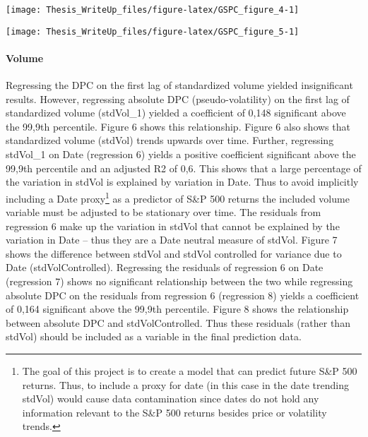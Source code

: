 \documentclass[11pt,preprint, authoryear]{elsarticle}
\let\origfigure\figure
\let\endorigfigure\endfigure
\renewenvironment{figure}[1][2] {
    \expandafter\origfigure\expandafter[H]
} {
    \endorigfigure
}
\numberwithin{equation}{section}
\numberwithin{figure}{section}
\numberwithin{table}{section}
\let\rmarkdownfootnote\footnote%
\def\footnote{\protect\rmarkdownfootnote}
\begin{document}
\begin{figure}[H]

{\centering \texttt{[image: Thesis\_WriteUp\_files/figure-latex/GSPC\_figure\_4-1]} 

}

\caption{S and P 500 Daily Percentage Change 1950 – Present \label{Figure4}}\label{fig:GSPC_figure_4}
\end{figure}

\begin{figure}[H]

{\centering \texttt{[image: Thesis\_WriteUp\_files/figure-latex/GSPC\_figure\_5-1]} 

}

\caption{Standardized volume (red) and absolute logDiff (green) \label{Figure5}}\label{fig:GSPC_figure_5}
\end{figure}

\hypertarget{volume}{%
\paragraph{Volume}\label{volume}}

Regressing the DPC on the first lag of standardized volume yielded
insignificant results. However, regressing absolute DPC
(pseudo-volatility) on the first lag of standardized volume (stdVol\_1)
yielded a coefficient of 0,148 significant above the 99,9th percentile.
Figure 6 shows this relationship. Figure 6 also shows that standardized
volume (stdVol) trends upwards over time. Further, regressing stdVol\_1
on Date (regression 6) yields a positive coefficient significant above
the 99,9th percentile and an adjusted R2 of 0,6. This shows that a large
percentage of the variation in stdVol is explained by variation in Date.
Thus to avoid implicitly including a Date proxy\footnote{The goal of
  this project is to create a model that can predict future S\&P 500
  returns. Thus, to include a proxy for date (in this case in the date
  trending stdVol) would cause data contamination since dates do not
  hold any information relevant to the S\&P 500 returns besides price or
  volatility trends.} as a predictor of S\&P 500 returns the included
volume variable must be adjusted to be stationary over time. The
residuals from regression 6 make up the variation in stdVol that cannot
be explained by the variation in Date -- thus they are a Date neutral
measure of stdVol. Figure 7 shows the difference between stdVol and
stdVol controlled for variance due to Date (stdVolControlled).
Regressing the residuals of regression 6 on Date (regression 7) shows no
significant relationship between the two while regressing absolute DPC
on the residuals from regression 6 (regression 8) yields a coefficient
of 0,164 significant above the 99,9th percentile. Figure 8 shows the
relationship between absolute DPC and stdVolControlled. Thus these
residuals (rather than stdVol) should be included as a variable in the
final prediction data.
\end{document}
